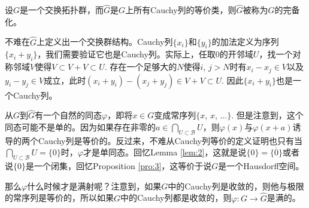 \begin{para}
	设$G$是一个交换拓扑群，而$\hat G$是$G$上所有Cauchy列的等价类，则$\hat G$被称为$G$的完备化。

	不难在$\hat G$上定义出一个交换群结构。Cauchy列$\{x_i\}$和$\{y_i\}$的加法定义为序列$\{x_i+y_i\}$，我们需要验证它也是Cauchy列。实际上，任取$0$的开邻域$U$，找一个对称邻域$V$使得$V\subset V+V\subset U$. 存在一个足够大的$N$使得$i$, $j>N$时有$x_i-x_j\in V$以及$y_i-y_j\in V$成立，此时$(x_i+y_i)-(x_j+y_j)\in V+V\subset U$. 因此$\{x_i+y_i\}$也是一个Cauchy列。

	从$G$到$\hat G$有一个自然的同态$\varphi$，即将$x\in G$变成常序列$\{x$, $x$, $\dots\}$. 但是注意到，这个同态可能不是单的。因为如果存在非零的$a\in\bigcap_{U\subset \mathscr{B}}U$，则$\varphi(x)$与$\varphi(x+a)$诱导的两个Cauchy列是等价的。反过来，不难从Cauchy列等价的定义证明也只有当$\bigcap_{U\subset \mathscr{B}}U=\{0\}$时，$\varphi$才是单同态。回忆Lemma \ref{lem:2}，这就是说$\{0\}=\overline{\{0\}}$或者说$\{0\}$是一个闭集，回忆Proposition \ref{pro:3}，这等价于说$G$是一个Hausdorff空间。

	那么$\varphi$什么时候才是满射呢？注意到，如果$G$中的Cauchy列是收敛的，则他与极限的常序列是等价的，所以如果$G$中的Cauchy列都是收敛的，则$\varphi:G\to \hat{G}$是满的。
\end{para}


